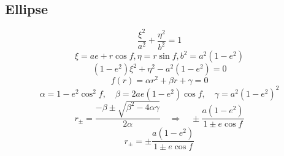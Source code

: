 \subsection{Ellipse}
\begin{equation}
	\frac{ \xi^{2} } { a^{2} } + \frac{ \eta^{2} } { b^{2} } = 1
\label{eq:derive:ellipse}
\end{equation}
\begin{equation}
	\xi = ae + r\cos f, \eta = r\sin f, b^{2} = a^{2}(1 - e^{2})
\label{eq:derive:subs}
\end{equation}
\begin{equation}
	(1 - e^{2}) \xi^{2} + \eta^{2} - a^{2}(1 - e^{2}) = 0
\label{eq:derive:new-quad}
\end{equation}
\begin{equation}
	f(r) = \alpha r^{2} + \beta r + \gamma = 0
\label{eq:derive:see-quad}
\end{equation}
\begin{equation}
	\alpha = 1 - e^{2} \cos^{2} f, \quad \beta = 2ae (1 - e^{2})\cos f, \quad \gamma = a^{2}(1 - e^{2})^{2}
\label{eq:derive:terms-quad}
\end{equation}
\begin{equation}
	r_{\pm} = \frac{ -\beta \pm \sqrt{ \beta^{2} - 4 \alpha \gamma}} { 2\alpha } \quad \Rightarrow \quad \pm \frac{ a(1 - e^{2}) } { 1 \pm  e \cos f }
\label{eq:derive:roots-quad}
\end{equation}
\begin{equation}
	r_{\pm} = \pm \frac{ a(1 - e^{2}) } { 1 \pm  e \cos f }
\label{eq:derive:roots-quad}
\end{equation}


\endinput  %
